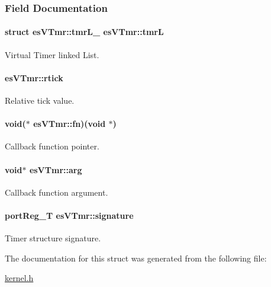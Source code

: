 \subsubsection{Field Documentation}
\hypertarget{structesVTmr_a1a73cb4cf2778a9e214afbcc36aa2692}{
\paragraph[{tmr\-L}]{\setlength{\rightskip}{0pt plus 5cm}struct {\bf es\-V\-Tmr\-::tmr\-L\-\_\-}                es\-V\-Tmr\-::tmr\-L}}\label{structesVTmr_a1a73cb4cf2778a9e214afbcc36aa2692}


Virtual Timer linked List. 

\hypertarget{structesVTmr_a4bbde49720b6aa0cc97e932ccb0383ea}{
\paragraph[{rtick}]{ es\-V\-Tmr\-::rtick}}\label{structesVTmr_a4bbde49720b6aa0cc97e932ccb0383ea}


Relative tick value. 

\hypertarget{structesVTmr_a17137ebfaf21de24d136b7d9b1390ddc}{
\paragraph[{fn}]{\setlength{\rightskip}{0pt plus 5cm}void($\ast$  es\-V\-Tmr\-::fn)(void $\ast$)}}\label{structesVTmr_a17137ebfaf21de24d136b7d9b1390ddc}


Callback function pointer. 

\hypertarget{structesVTmr_a4bd88651471b32f1fe71b4cec22756c0}{
\paragraph[{arg}]{\setlength{\rightskip}{0pt plus 5cm}void$\ast$ es\-V\-Tmr\-::arg}}\label{structesVTmr_a4bd88651471b32f1fe71b4cec22756c0}


Callback function argument. 

\hypertarget{structesVTmr_a8a620761f277b95ead5fc6f52c898daf}{
\paragraph[{signature}]{\setlength{\rightskip}{0pt plus 5cm}port\-Reg\-\_\-\-T es\-V\-Tmr\-::signature}}\label{structesVTmr_a8a620761f277b95ead5fc6f52c898daf}


Timer structure signature. 



The documentation for this struct was generated from the following file\-:\begin{DoxyCompactItemize}
\item 
\hyperlink{kernel_8h}{kernel.\-h}\end{DoxyCompactItemize}
